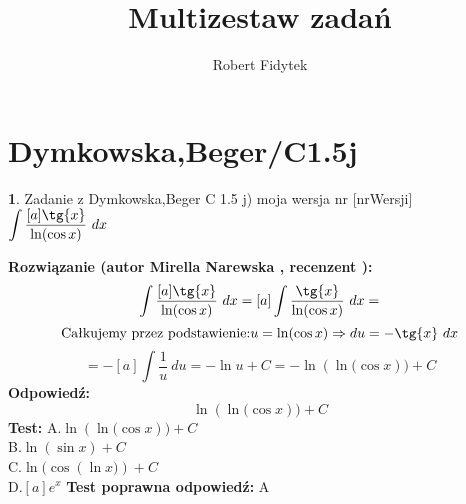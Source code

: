 \documentclass[12pt, a4paper]{article}
\title{Multizestaw zadań}
\author{Robert Fidytek}
\date{}
\theoremstyle{definition} %
\newtheorem{zad}{}
\newcommand{\kategoria}[1]{\section{#1}} %
\newcommand{\zadStart}[1]{\begin{zad}#1\newline} %
\newcommand{\zadStop}{\end{zad}}   %
\newcommand{\rozwStart}[2]{\noindent \textbf{Rozwiązanie (autor #1 , recenzent #2): }\newline} %
\newcommand{\odpStart}{\noindent \textbf{Odpowiedź:}\newline}    %
\newcommand{\odpStop}{\newline}                                             %
\newcommand{\testStart}{\noindent \textbf{Test:}\newline} %
\newcommand{\testStop}{\newline} %
\newcommand{\kluczStart}{\noindent \textbf{Test poprawna odpowiedź:}\newline} %
\newcommand{\kluczStop}{\newline} %
\begin{document}
\maketitle



\kategoria{Dymkowska,Beger/C1.5j}
\zadStart{Zadanie z Dymkowska,Beger C 1.5 j) moja wersja nr [nrWersji]}
 $\displaystyle \int \frac{[a]\tg{x}}{\ln({\cos{x})}} \ dx$
\zadStop
\rozwStart{Mirella Narewska}{}
$$\int \frac{[a]\tg{x}}{\ln({\cos{x})}} \ dx =[a]\int \frac{\tg{x}}{\ln({\cos{x})}} \ dx=$$
$$\text{Całkujemy przez podstawienie:} u=\ln({\cos{x}})\Rightarrow du=-\tg{x}  \ dx$$
$$=-[a]\int \frac{1}{u} \ du=-\ln{u}+C=-\ln({\ln({\cos{x}}}))+C$$
\odpStart
$$\ln({\ln({\cos{x}}}))+C$$
\odpStop
\testStart
A.$\ln({\ln({\cos{x}}}))+C$
\\
B.$\ln(\sin{x})+C$
\\
C.$\ln({\cos({\ln{x})})}+C$
\\
D.$[a]e^{x}$
\testStop
\kluczStart
A
\kluczStop
\end{document}
